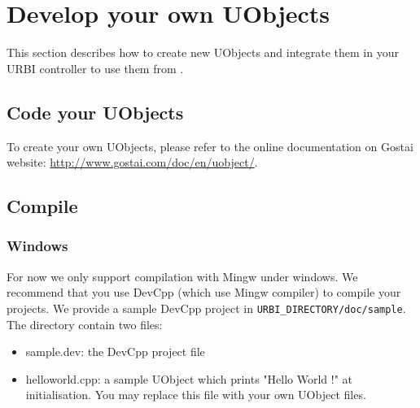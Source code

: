 
\section{Develop your own UObjects}
\label{webots.ownuobjects}%

This section describes how to create new UObjects and integrate them
in your URBI controller to use them from .


\subsection{Code your UObjects}
\label{webots.ownuobjects.code}%

   To create your own UObjects, please refer to the online documentation
  on Gostai website: \url{http://www.gostai.com/doc/en/uobject/}.


\subsection{Compile}
\label{webots.ownuobjects.compile}%

\subsubsection{Windows}
\label{webots.ownuobjects.compile.windows}%

     For now we only support compilation with Mingw under windows. We
    recommend that you use DevCpp (which use Mingw compiler) to compile
    your projects.
    We provide a sample DevCpp project in \nolinkurl{URBI_DIRECTORY/doc/sample}.
    The directory contain two files:
 \begin{itemize}

\item{}         sample.dev: the DevCpp project file



\item{}         helloworld.cpp: a sample UObject which prints "Hello World !" at
        initialisation. You may replace this file with your own UObject
        files.


\end{itemize}


